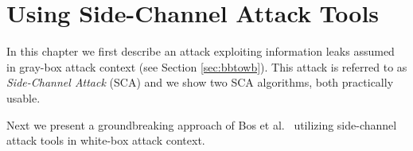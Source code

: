 \chapter{Using Side-Channel Attack Tools}
\label{chap:attack}

In this chapter we first describe an attack exploiting information leaks assumed in gray-box attack context (see Section \ref{sec:bbtowb}). This attack is referred to as {\em Side-Channel Attack} (SCA) and we show two SCA algorithms, both practically usable.

Next we present a groundbreaking approach of Bos et al.\ \cite{bos2015differential} utilizing side-channel attack tools in white-box attack context.





